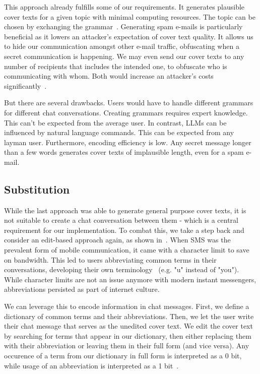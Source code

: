 This approach already fulfills some of our requirements. It generates plausible cover texts for a given topic with minimal computing resources. The topic can be chosen by exchanging the grammar~\cite{spammimicSpammimic2000}. Generating spam e-mails is particularly beneficial as it lowers an attacker's expectation of cover text quality. It allows us to hide our communication amongst other e-mail traffic, obfuscating when a secret communication is happening. We may even send our cover texts to any number of recipients that includes the intended one, to obfuscate who is communicating with whom. Both would increase an attacker's costs significantly~\cite{bennettLinguisticSteganographySurvey2004,petitcolasInformationHidingSurvey1999}.

But there are several drawbacks. Users would have to handle different grammars for different chat conversations. Creating grammars requires expert knowledge. This can't be expected from the average user. In contrast, \glspl{LLM} can be influenced by natural language commands. This can be expected from any layman user. Furthermore, encoding efficiency is low. Any secret message longer than a few words generates cover texts of implausible length, even for a spam e-mail.

\subsection{Substitution}
\label{sec:substitution}
While the last approach was able to generate general purpose cover texts, it is not suitable to create a chat conversation between them - which is a central requirement for our implementation. To combat this, we take a step back and consider an edit-based approach again, as shown in~\cite{shirali-shahrezaTextSteganographySMS2007}. When \gls{SMS} was the prevalent form of mobile communication, it came with a character limit to save on bandwidth. This led to users abbreviating common terms in their conversations, developing their own terminology~\cite{shirali-shahrezaTextSteganographySMS2007} (e.g. "u" instead of "you"). While character limits are not an issue anymore with modern instant messengers, abbreviations persisted as part of internet culture.

We can leverage this to encode information in chat messages. First, we define a dictionary of common terms and their abbreviations. Then, we let the user write their chat message that serves as the unedited cover text. We edit the cover text by searching for terms that appear in our dictionary, then either replacing them with their abbreviation or leaving them in their full form (and vice versa). Any occurence of a term from our dictionary in full form is interpreted as a 0 bit, while usage of an abbreviation is interpreted as a 1 bit~\cite{shirali-shahrezaTextSteganographySMS2007}.

